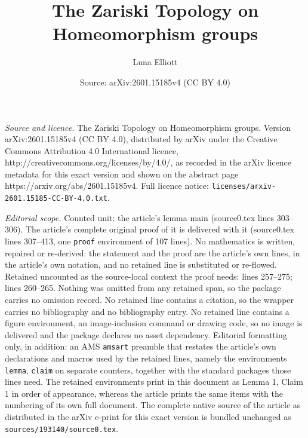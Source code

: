 \documentclass[10pt,a4paper]{amsart}
\title{The Zariski Topology on Homeomorphism groups}
\author{Luna Elliott}
\date{Source: arXiv:2601.15185v4 (CC BY 4.0)}
\begin{document}
\maketitle

\noindent\emph{Source and licence.} The Zariski Topology on Homeomorphism groups. Version arXiv:2601.15185v4 (CC BY 4.0), distributed by arXiv under the Creative Commons Attribution 4.0 International licence, http://creativecommons.org/licenses/by/4.0/, as recorded in the arXiv licence metadata for this exact version and shown on the abstract page https://arxiv.org/abs/2601.15185v4. Full licence notice: \texttt{licenses/arxiv-2601.15185-CC-BY-4.0.txt}.\par\smallskip

\noindent\textit{Editorial scope.} Counted unit: the article's lemma main (source0.tex lines 303--306). The article's complete original proof of it is delivered with it (source0.tex lines 307--413, one \texttt{proof} environment of 107 lines). No mathematics is written, repaired or re-derived: the statement and the proof are the article's own lines, in the article's own notation, and no retained line is substituted or re-flowed.  Retained uncounted as the source-local context the proof needs: lines 257--275; lines 260--265.  Nothing was omitted from any retained span, so the package carries no omission record.  No retained line contains a citation, so the wrapper carries no bibliography and no bibliography entry.  No retained line contains a figure environment, an image-inclusion command or drawing code, so no image is delivered and the package declares no asset dependency.  Editorial formatting only, in addition: an AMS \texttt{amsart} preamble that restates the article's own declarations and macros used by the retained lines, namely the environments \texttt{lemma}, \texttt{claim} on separate counters, together with the standard packages those lines need.  The retained environments print in this document as Lemma 1, Claim 1 in order of appearance, whereas the article prints the same items with the numbering of its own full document.  The complete native source of the article as distributed in the arXiv e-print for this exact version is bundled unchanged as \texttt{sources/193140/source0.tex}.
\end{document}
